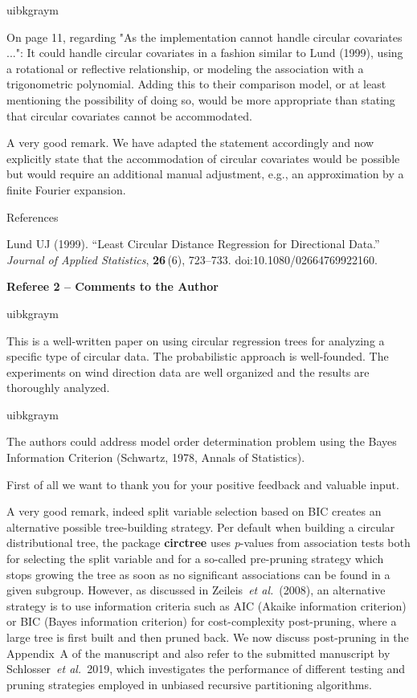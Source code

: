 \documentclass[english, noconfig]{uibklttr}
\newcommand{\section}[1]{{\Large{\textbf{#1}}}}
\newenvironment{re}{
    \begin{color}{uibkgraym}
        \itshape
}{
    \end{color}
}
\begin{document}
\vspace{0.5em}
\begin{re}
On page 11, regarding "As the implementation cannot handle circular
covariates ...": It could handle circular covariates in a fashion similar to
Lund (1999), using a rotational or reflective relationship, or modeling the
association with a trigonometric polynomial. Adding this to their comparison
model, or at least mentioning the possibility of doing so, would be more
appropriate than stating that circular covariates cannot be accommodated.
\end{re}

A very good remark. We have adapted the statement accordingly and now
explicitly state that the accommodation of circular covariates would be
possible but would require an additional manual adjustment, e.g., an approximation by
a finite Fourier expansion.

\vspace{0.5cm}
References

Lund UJ (1999). ``Least Circular Distance Regression for Directional Data.''
\emph{Journal of Applied Statistics}, \textbf{26}\,(6), 723--733.
doi:10.1080/02664769922160.

\newpage

\section{Referee 2 -- Comments to the Author}

\begin{re}
This is a well-written paper on using circular regression trees for analyzing a
specific type of circular data. The probabilistic approach is well-founded. The
experiments on wind direction data are well organized and the results are
thoroughly analyzed.
\end{re}

\begin{re}
The authors could address model order determination problem using the
Bayes Information Criterion (Schwartz, 1978, Annals of Statistics).  
\end{re}

First of all we want to thank you for your positive feedback and valuable input. 

A very good remark, indeed split variable selection based on BIC creates an
alternative possible tree-building strategy. Per default when building a
circular distributional tree, the package \textbf{circtree} uses
\emph{p}-values from association tests both for selecting the split variable
and for a so-called pre-pruning strategy which stops growing the tree as soon
as no significant associations can be found in a given subgroup. However, as
discussed in Zeileis~\emph{et al.}~(2008), an alternative strategy is to use
information criteria such as AIC (Akaike information criterion) or BIC (Bayes
information criterion) for cost-complexity post-pruning, where a large tree is
first built and then pruned back. We now discuss post-pruning in the Appendix~A
of the manuscript and also refer to the submitted manuscript by
Schlosser~\emph{et al.}~2019, which investigates the performance of different
testing and pruning strategies employed in unbiased recursive partitioning
algorithms.
\end{document}
